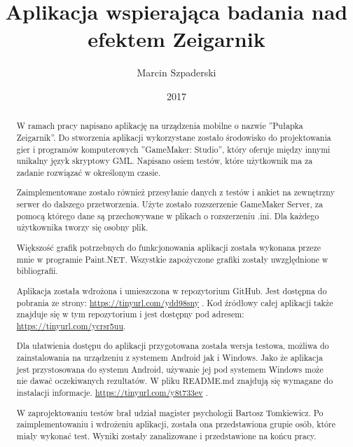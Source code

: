 \documentclass[openright]{xmgr}
\author   {Marcin Szpaderski}
\title    {Aplikacja wspierająca badania nad efektem Zeigarnik}
\date     {2017}
\begin{document}
\begin{abstract}
W ramach pracy napisano aplikację na urządzenia mobilne o nazwie ”Pułapka
Zeigarnik”. Do stworzenia aplikacji wykorzystane zostało środowisko do
projektowania gier i programów komputerowych ”GameMaker: Studio”, który
oferuje między innymi unikalny język skryptowy GML. Napisano osiem
testów, które użytkownik ma za zadanie rozwiązać w określonym czasie.

Zaimplementowane zostało również przesyłanie danych z testów i ankiet
na zewnętrzny serwer do dalszego przetworzenia. Użyte zostało rozszerzenie
GameMaker Server, za pomocą którego dane są przechowywane w plikach o
rozszerzeniu .ini. Dla każdego użytkownika tworzy się osobny plik.

Większość grafik potrzebnych do funkcjonowania aplikacji została wykonana
przeze mnie w programie Paint.NET. Wszystkie zapożyczone grafiki
zostały uwzględnione w bibliografii.

Aplikacja została wdrożona i umieszczona w repozytorium GitHub. Jest
dostępna do pobrania ze strony: \url{https://tinyurl.com/ydd98sny} . Kod
źródłowy całej aplikacji także znajduje się w tym repozytorium i jest dostępny
pod adresem: \url{https://tinyurl.com/ycrsr5uu}.

Dla ułatwienia dostępu do aplikacji przygotowana została wersja testowa,
możliwa do zainstalowania na urządzeniu z systemem Android jak i
Windows. Jako że aplikacja jest przystosowana do systemu Android, używanie
jej pod systemem Windows może nie dawać oczekiwanych rezultatów.
W pliku README.md znajdują się wymagane do instalacji informacje.
\url{https://tinyurl.com/y8t733ev} .

W zaprojektowaniu testów brał udział magister psychologii Bartosz Tomkiewicz.
Po zaimplementowaniu i wdrożeniu aplikacji, została ona przedstawiona
grupie osób, które miały wykonać test. Wyniki zostały zanalizowane i
przedstawione na końcu pracy.






\end{abstract}


\maketitle
\end{document}

